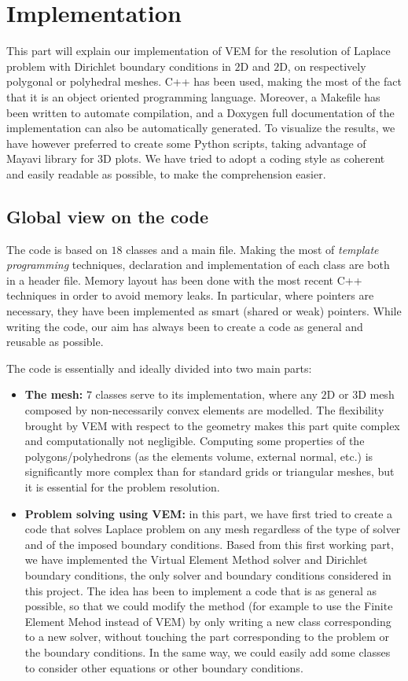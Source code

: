 \newpage
\section{Implementation}

This part will explain our implementation of VEM for the resolution of Laplace problem with Dirichlet boundary conditions in $2$D and $2$D, on respectively polygonal or polyhedral meshes. C++ has been used, making the most of the fact that it is an object oriented programming language. Moreover, a Makefile has been written to automate compilation, and a Doxygen full documentation of the implementation can also be automatically generated. To visualize the results, we have however preferred to create some Python scripts, taking advantage of Mayavi library for $3$D plots. We have tried to adopt a coding style as coherent and easily readable as possible, to make the comprehension easier. 

\subsection{Global view on the code}
The code is based on $18$ classes and a main file. Making the most of \textit{template programming} techniques, declaration and implementation of each class are both in a header file. Memory layout has been done with the most recent C++ techniques in order to avoid memory leaks. In particular, where pointers are necessary, they have been implemented as smart (shared or weak) pointers. While writing the code, our aim has always been to create a code as general and reusable as possible. \newline

The code is essentially and ideally divided into two main parts:
\begin{itemize}
\item \textbf{The mesh:} $7$ classes serve to its implementation, where any $2$D or $3$D mesh composed by non-necessarily convex elements are modelled. The flexibility brought by VEM with respect to the geometry makes this part quite complex and computationally not negligible. Computing some properties of the polygons/polyhedrons (as the elements volume, external normal, etc.) is significantly more complex than for standard grids or triangular meshes, but it is essential for the problem resolution. 
\item \textbf{Problem solving using VEM:} in this part, we have first tried to create a code that solves Laplace problem on any mesh regardless of the type of solver and of the imposed boundary conditions. Based from this first working part, we have implemented the Virtual Element Method solver and Dirichlet boundary conditions, the only solver and boundary conditions considered in this project. The idea has been to implement a code that is as general as possible, so that we could modify the method (for example to use the Finite Element Mehod instead of VEM) by only writing a new class corresponding to a new solver, without touching the part corresponding to the problem or the boundary conditions. In the same way, we could easily add some classes to consider other equations or other boundary conditions. 
\end{itemize}

